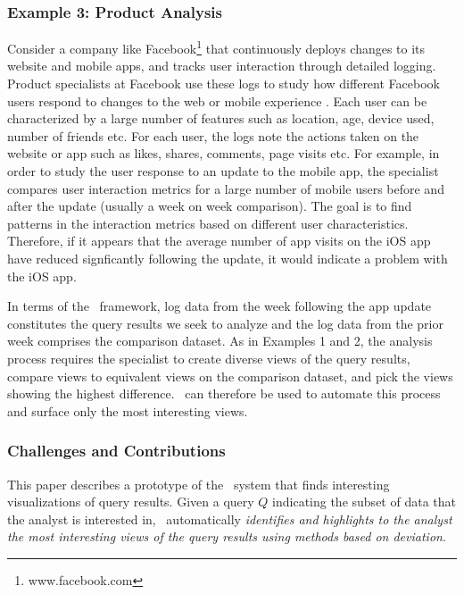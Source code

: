 \subsubsection*{Example 3: Product Analysis}

Consider a company like Facebook\footnote{www.facebook.com} that continuously
deploys changes to its website and mobile apps, and tracks user interaction
through detailed logging. Product specialists at Facebook use these logs to
study how different Facebook users respond to changes to the web or mobile
experience \cite{DBLP:conf/vldb/AbrahamABB13}. Each user can be characterized by a large number
of features such as location, age, device used, number of friends etc.
For each user, the logs note the actions taken on the website or app such
as likes, shares, comments, page visits etc. For example, in order to study
the user response to an update to the mobile app, the specialist compares user
interaction metrics for a large number of mobile users before and after the
update (usually a week on week comparison). The goal is to find patterns in the
interaction metrics based on different user characteristics. Therefore, if it
appears that the average number of app visits on the iOS app have reduced
signficantly following the update, it would indicate a problem with the iOS app.

In terms of the \SeeDB\ framework, log data from the week following the app
update constitutes the query results we seek to analyze and the log data from
the prior week comprises the comparison dataset. As in Examples 1 and 2, the
analysis process requires the specialist to create diverse views of the query
results, compare views to equivalent views on the comparison dataset, and
pick the views showing the highest difference. 
\SeeDB\ can therefore be used to automate this process and surface only the most
interesting views.


\subsubsection*{Challenges and Contributions}

This paper describes a prototype of the \SeeDB\ system that finds interesting
visualizations of query results. 
Given a query $Q$ indicating the subset of data that the analyst is interested in, \SeeDB\ automatically {\em identifies and highlights to the
analyst the most interesting views of the query results using methods based on
deviation}. 

